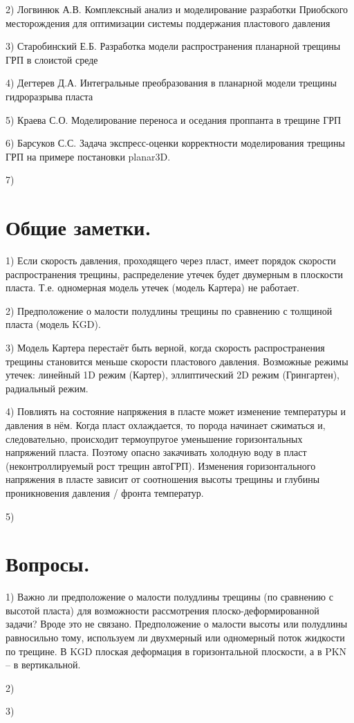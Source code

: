 \documentclass[a4paper, 11pt]{article}
\begin{document}
2) Логвинюк А.В. Комплексный анализ и моделирование разработки Приобского месторождения для оптимизации системы поддержания пластового давления

3) Старобинский Е.Б. Разработка модели распространения планарной трещины ГРП в слоистой среде

4) Дегтерев Д.А. Интегральные преобразования в планарной модели трещины гидроразрыва пласта

5) Краева С.О. Моделирование переноса и оседания проппанта в трещине ГРП

6) Барсуков С.С. Задача экспресс-оценки корректности моделирования трещины ГРП на примере постановки planar3D.

7) 
\\


\section{Общие заметки.}

1) Если скорость давления, проходящего через пласт, имеет порядок скорости распространения трещины, распределение утечек будет двумерным в плоскости пласта. Т.е. одномерная модель утечек (модель Картера) не работает.

2) Предположение о малости полудлины трещины по сравнению с толщиной пласта (модель KGD).

3) Модель Картера перестаёт быть верной, когда скорость распространения трещины становится меньше скорости пластового давления.
Возможные режимы утечек: линейный 1D режим (Картер), эллиптический 2D режим (Грингартен), радиальный режим.

4) Повлиять на состояние напряжения в пласте может изменение температуры и давления в нём.
Когда пласт охлаждается, то порода начинает сжиматься и, следовательно, происходит термоупругое уменьшение горизонтальных напряжений пласта.
Поэтому опасно закачивать холодную воду в пласт (неконтроллируемый рост трещин автоГРП).
Изменения горизонтального напряжения в пласте зависит от соотношения высоты трещины и глубины проникновения давления / фронта температур.

5)
\\

\section{Вопросы.}

1) Важно ли предположение о малости полудлины трещины (по сравнению с высотой пласта) для возможности рассмотрения плоско-деформированной задачи?
Вроде это не связано.
Предположение о малости высоты или полудлины равносильно тому, используем ли двухмерный или одномерный поток жидкости по трещине.
В KGD плоская деформация в горизонтальной плоскости, а в PKN -- в вертикальной.

2) 

3)
\end{document}
